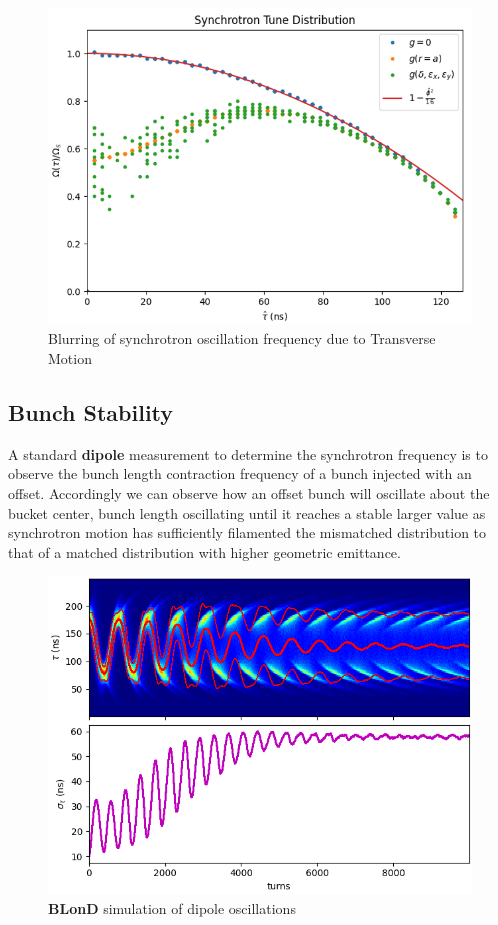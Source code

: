 \begin{figure}
    \centering
    \includegraphics{figs/tune_blurr/normalized_tune.png}
    \caption{Blurring of synchrotron oscillation frequency due to Transverse Motion}
\end{figure}

\subsection{Bunch Stability}

A standard \textbf{dipole} measurement to determine the synchrotron frequency is to observe the bunch length contraction frequency of a bunch injected with an offset. Accordingly we can observe how an offset bunch will oscillate about the bucket center, bunch length oscillating until it reaches a stable larger value as synchrotron motion has sufficiently filamented the mismatched distribution to that of a matched distribution with higher geometric emittance.

\begin{figure}
    \centering
    \includegraphics{figs/dipole_oscillation.png}
    \caption{\textbf{BLonD} simulation of dipole oscillations}
\end{figure}

